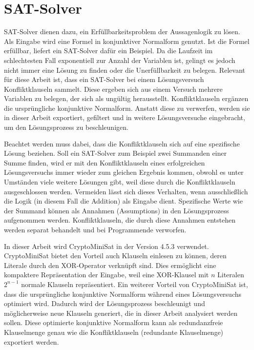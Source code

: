 \section{SAT-Solver}
\label{sec:satsolver}

SAT-Solver dienen dazu, ein Erfüllbarkeitsproblem der Aussagenlogik zu lösen. Als Eingabe wird eine Formel in konjunktiver Normalform genutzt.
Ist die Formel erfüllbar, liefert ein SAT-Solver dafür ein Beispiel. Da die Laufzeit im schlechtesten Fall exponentiell zur Anzahl der Variablen
ist, gelingt es jedoch nicht immer eine Lösung zu finden oder die Unerfüllbarkeit zu belegen. Relevant für diese Arbeit ist, dass ein SAT-Solver
bei einem Lösungsversuch Konfliktklauseln sammelt. Diese ergeben sich aus einem Versuch mehrere Variablen zu belegen, der sich als ungültig herausstellt.
Konfliktklauseln ergänzen die ursprüngliche konjunktive Normalform. Anstatt diese zu verwerfen, werden sie in dieser Arbeit exportiert, gefiltert
und in weitere Lösungsversuche eingebracht, um den Lösungsprozess zu beschleunigen.

Beachtet werden muss dabei, dass die Konfliktklauseln sich auf eine spezifische Lösung beziehen. Soll ein SAT-Solver zum Beispiel zwei Summanden
einer Summe finden, wird er mit den Konfliktklauseln eines erfolgreichen Lösungsversuchs immer wieder zum gleichen Ergebnis kommen, obwohl es
unter Umständen viele weitere Lösungen gibt, weil diese durch die Konfliktklauseln ausgeschlossen werden. Vermeiden lässt sich dieses Verhalten,
wenn ausschließlich die Logik (in diesem Fall die Addition) als Eingabe dient. Spezifische Werte wie der Summand können als Annahmen (Assumptions)
in den Lösungsprozess aufgenommen werden. Konfliktklauseln, die durch diese Annahmen entstehen werden separat behandelt und bei Programmende verworfen.

In dieser Arbeit wird CryptoMiniSat in der Version 4.5.3 verwendet. CryptoMiniSat bietet den Vorteil auch Klauseln einlesen zu können, deren Literale
durch den XOR-Operator verknüpft sind. Dies ermöglicht eine kompaktere Repräsentation der Eingabe, weil eine XOR-Klausel mit $n$ Literalen $2^{n-1}$
normale Klauseln repräsentiert. Ein weiterer Vorteil von CryptoMiniSat ist, dass die ursprüngliche konjunktive Normalform während eines Lösungsversuchs
optimiert wird. Dadurch wird der Lösungsprozess beschleunigt und möglicherweise neue Klauseln generiert, die in dieser Arbeit analysiert werden sollen. 
Diese optimierte konjunktive Normalform kann als redundanzfreie Klauselmenge genau wie die Konfliktklauseln (redundante Klauselmenge) exportiert werden.